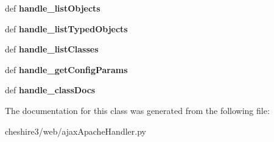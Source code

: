 \begin{DoxyCompactItemize}
\item 
\hypertarget{classcheshire3_1_1web_1_1ajax_apache_handler_1_1req_handler_a0236e5f4e1f5c824939b1c74dc729f4d}{def {\bfseries handle\-\_\-list\-Objects}}\label{classcheshire3_1_1web_1_1ajax_apache_handler_1_1req_handler_a0236e5f4e1f5c824939b1c74dc729f4d}

\item 
\hypertarget{classcheshire3_1_1web_1_1ajax_apache_handler_1_1req_handler_a8b1d7c524859d0b209a8ca3d8536c3e5}{def {\bfseries handle\-\_\-list\-Typed\-Objects}}\label{classcheshire3_1_1web_1_1ajax_apache_handler_1_1req_handler_a8b1d7c524859d0b209a8ca3d8536c3e5}

\item 
\hypertarget{classcheshire3_1_1web_1_1ajax_apache_handler_1_1req_handler_a04542e74fd3c923d3a1b9e664b5998f2}{def {\bfseries handle\-\_\-list\-Classes}}\label{classcheshire3_1_1web_1_1ajax_apache_handler_1_1req_handler_a04542e74fd3c923d3a1b9e664b5998f2}

\item 
\hypertarget{classcheshire3_1_1web_1_1ajax_apache_handler_1_1req_handler_af61dd29abd7d4a33fa6bc6e806d5b9ec}{def {\bfseries handle\-\_\-get\-Config\-Params}}\label{classcheshire3_1_1web_1_1ajax_apache_handler_1_1req_handler_af61dd29abd7d4a33fa6bc6e806d5b9ec}

\item 
\hypertarget{classcheshire3_1_1web_1_1ajax_apache_handler_1_1req_handler_af4456547d9847370ecf40e3c133cf8d6}{def {\bfseries handle\-\_\-class\-Docs}}\label{classcheshire3_1_1web_1_1ajax_apache_handler_1_1req_handler_af4456547d9847370ecf40e3c133cf8d6}

\end{DoxyCompactItemize}


The documentation for this class was generated from the following file\-:\begin{DoxyCompactItemize}
\item 
cheshire3/web/ajax\-Apache\-Handler.\-py\end{DoxyCompactItemize}
